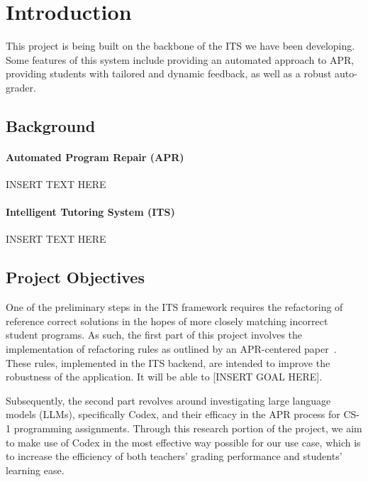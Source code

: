 \chapter{Introduction}

This project is being built on the backbone of the ITS we have been developing.
Some features of this system include providing an automated approach to APR,
providing students with tailored and dynamic feedback, as well as a robust auto-grader.

\section{Background}

\subsubsection{Automated Program Repair (APR)}

INSERT TEXT HERE

\subsubsection{Intelligent Tutoring System (ITS)}

INSERT TEXT HERE

\section{Project Objectives}

One of the preliminary steps in the ITS framework requires the refactoring of reference correct
solutions in the hopes of more closely matching incorrect student programs.
As such, the first part of this project involves the implementation of refactoring rules as
outlined by an APR-centered paper~\cite{hu2019re}.
These rules, implemented in the ITS backend, are intended to improve the robustness of the
application.
It will be able to [INSERT GOAL HERE].

Subsequently, the second part revolves around investigating large language models (LLMs),
specifically Codex, and their efficacy in the APR process for CS-1 programming assignments.
Through this research portion of the project, we aim to make use of Codex in the most
effective way possible for our use case, which is to increase the efficiency of both
teachers' grading performance and students' learning ease.


